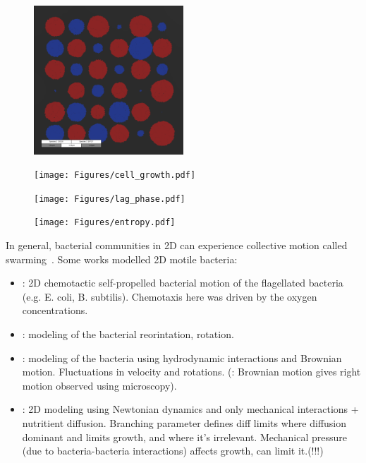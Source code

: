 \documentclass[10pt,A4paper]{article}
\begin{document}
\begin{figure}
    \includegraphics[width=0.5\textwidth]{Figures/snapshot_00020000.png}%
    \caption{}
    \label{fig:spatial-snapshots}
\end{figure}
%
%
\begin{figure}
    \centering
    \texttt{[image: Figures/cell\_growth.pdf]}
    \caption{}
    \label{fig:spatial-growth-curve}
\end{figure}
%
%
\begin{figure}
    \centering
    \texttt{[image: Figures/lag\_phase.pdf]}
    \caption{}
    \label{fig:spatial-lag-phase}
\end{figure}
%
%
\begin{figure}
    \centering
    \texttt{[image: Figures/entropy.pdf]}
    \caption{}
    \label{fig:spatial-entropy}
\end{figure}
%
%
In general, bacterial communities in 2D can experience collective motion called swarming~\cite{wu_collective_2015}.
Some works modelled 2D motile bacteria:
\begin{itemize}
    \item \cite{decoene_microscopic_2011}: 2D chemotactic self-propelled bacterial motion of the flagellated bacteria (e.g. E. coli, B. subtilis).
    Chemotaxis here was driven by the oxygen concentrations.
    \item \cite{rosser_modelling_2014}: modeling of the bacterial reorintation, rotation.
    \item \cite{sokolov_physical_2012, li_amplified_2008}: modeling of the bacteria using hydrodynamic interactions and Brownian motion.
    Fluctuations in velocity and rotations.
    (\cite{li_amplified_2008}: Brownian motion gives right motion observed using microscopy).
    \item \cite{farrell_mechanically_2013}: 2D modeling using Newtonian dynamics and only mechanical interactions + nutritient diffusion.
    Branching parameter defines diff limits where diffusion dominant and limits growth, and where it's irrelevant.
    Mechanical pressure (due to bacteria-bacteria interactions) affects growth, can limit it.(!!!)
\end{itemize}
\end{document}
